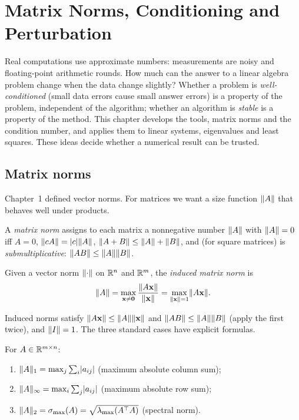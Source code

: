 \chapter{Matrix Norms, Conditioning and Perturbation}

Real computations use approximate numbers: measurements are noisy and floating-point arithmetic rounds. How much can the answer to a linear algebra problem change when the data change slightly? Whether a problem is \emph{well-conditioned} (small data errors cause small answer errors) is a property of the problem, independent of the algorithm; whether an algorithm is \emph{stable} is a property of the method. This chapter develops the tools, matrix norms and the condition number, and applies them to linear systems, eigenvalues and least squares. These ideas decide whether a numerical result can be trusted.

\section{Matrix norms}

Chapter~1 defined vector norms. For matrices we want a size function $\lVert A\rVert$ that behaves well under products.

\begin{definition}
A \emph{matrix norm} assigns to each matrix a nonnegative number $\lVert A\rVert$ with $\lVert A\rVert=0$ iff $A=0$, $\lVert cA\rVert=\lvert c\rvert\lVert A\rVert$, $\lVert A+B\rVert\le\lVert A\rVert+\lVert B\rVert$, and (for square matrices) is \emph{submultiplicative}: $\lVert AB\rVert\le\lVert A\rVert\lVert B\rVert$.
\end{definition}

\begin{definition}
Given a vector norm $\lVert\cdot\rVert$ on $\mathbb{R}^n$ and $\mathbb{R}^m$, the \emph{induced matrix norm} is
\[ \lVert A\rVert=\max_{\mathbf{x}\ne\mathbf{0}}\frac{\lVert A\mathbf{x}\rVert}{\lVert\mathbf{x}\rVert}=\max_{\lVert\mathbf{x}\rVert=1}\lVert A\mathbf{x}\rVert. \]
\end{definition}

Induced norms satisfy $\lVert A\mathbf{x}\rVert\le\lVert A\rVert\lVert\mathbf{x}\rVert$ and $\lVert AB\rVert\le\lVert A\rVert\lVert B\rVert$ (apply the first twice), and $\lVert I\rVert=1$. The three standard cases have explicit formulas.

\begin{theorem}\label{thm:indnorms}
For $A\in\mathbb{R}^{m\times n}$:
\begin{enumerate}[label=(\roman*)]
  \item $\lVert A\rVert_1=\max_j\sum_i\lvert a_{ij}\rvert$ (maximum absolute column sum);
  \item $\lVert A\rVert_\infty=\max_i\sum_j\lvert a_{ij}\rvert$ (maximum absolute row sum);
  \item $\lVert A\rVert_2=\sigma_{\max}(A)=\sqrt{\lambda_{\max}(A^{\top} A)}$ (spectral norm).
\end{enumerate}
\end{theorem}

